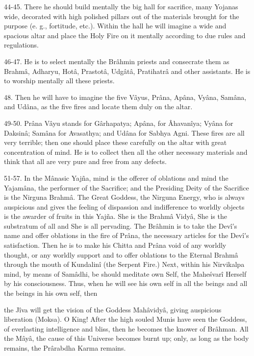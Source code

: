 44-45. There he should build mentally the big hall for sacrifice, many Yojanas wide, decorated with high polished pillars out of the materials brought for the purpose (e. g., fortitude, etc.). Within the hall he will imagine a wide and spacious altar and place the Holy Fire on it mentally according to due rules and regulations.

46-47. He is to select mentally the Br\^ahmin priests and consecrate them as Brahm\^a, Adharyu, Hot\^a, Prastot\^a, Udg\^at\^a, Pratihatr\^a and other assistants. He is to worship mentally all these priests.

48. Then he will have to imagine the five V\^ayus, Pr\^ana, Ap\^ana, Vy\^ana, Sam\^ana, and Ud\^ana, as the five fires and locate them duly on the altar.

49-50. Pr\^ana V\^ayu stands for G\^arhapatya; Ap\^ana, for Âhavan\^iya; Vy\^ana for Daksin\^a; Sam\^ana for Avasathya; and Ud\^ana for Sabhya Agni. These fires are all very terrible; then one should place these carefully on the altar with great concentration of mind. He is to collect then all the other necessary materials and think that all are very pure and free from any defects.

51-57. In the M\^anasic Yaj\~na, mind is the offerer of oblations and mind the Yajam\^ana, the performer of the Sacrifice; and the Presiding Deity of the Sacrifice is the Nirguna Brahm\^a. The Great Goddess, the Nirguna Energy, who is always auspicious and gives the feeling of dispassion and indifference to worldly objects is the awarder of fruits in this Yaj\~na. She is the Brahm\^a Vidy\^a, She is the substratum of all and She is all pervading. The Br\^ahmin is to take the Dev\^i's name and offer oblations in the fire of Pr\^ana, the necessary articles for the Dev\^i's satisfaction. Then he is to make his Chitta and Pr\^ana void of any worldly thought, or any worldly support and to offer oblations to the Eternal Brahm\^a through the mouth of Kundalin\^i (the Serpent Fire.) Next, within his Nirvikalpa mind, by means of Sam\^adhi, be should meditate own Self, the Mahe\'svar\^i Herself by his consciousness. Thus, when he will see his own self in all the beings and all the beings in his own self, then

the J\^iva will get the vision of the Goddess Mah\^avidy\^a, giving auspicious liberation (Moksa). O King! After the high souled Munis have seen the Goddess, of everlasting intelligence and bliss, then he becomes the knower of Br\^ahman. All the M\^ay\^a, the cause of this Universe becomes burnt up; only, as long as the body remains, the Pr\^arabdha Karma remains.

